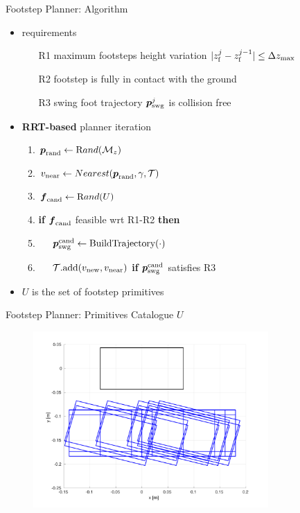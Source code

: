 \documentclass[10pt]{beamer}
\begin{document}
\begin{frame}{Footstep Planner: Algorithm}
  \begin{itemize}
    \item requirements
      \begin{itemize}[<alert@+>]
        \item[R1] maximum footsteps height variation
				    $|z_{\rm f}^j - z_{\rm f}^{j-1}| \le \Delta z_{\max}$
        \item[R2] footstep is fully in contact with the ground
        \item[R3] swing foot trajectory ${\mbox{\boldmath $p$}}_{\rm {swg}}^j$ is collision free
			\end{itemize}
    \item \textbf{RRT-based} planner iteration
      \begin{enumerate}[<alert@+>]
        \item ${\mbox{\boldmath $p$}}_{\rm rand} \leftarrow {\text Rand}(\mathcal{M}_z)$
				\item $v_{\rm near} \leftarrow Nearest({\mbox{\boldmath $p$}}_{\rm rand}, \gamma,
            \mathcal{T})$
        \item ${\mbox{\boldmath $f$}}_{\rm cand} \leftarrow {\text Rand}(U)$
				\item \textbf{if} ${\mbox{\boldmath $f$}}_{\rm cand}$ feasible wrt R1-R2 \textbf{then}
				\item $\quad$ ${\mbox{\boldmath $p$}}_{\rm swg}^{\rm cand}
						\leftarrow \text{BuildTrajectory}(\cdot)$
				\item $\quad$ $\mathcal{T}\text{.add}(v_{\rm new}, v_{\rm near})$
						\textbf{if} ${\mbox{\boldmath $p$}}_{\rm swg}^{\rm cand}$ satisfies R3
      \end{enumerate}
    \item $U$ is the set of footstep primitives
	\end{itemize}
\end{frame}

\begin{frame}{Footstep Planner: Primitives Catalogue $U$}
	\begin{figure}
		\centering
		\includegraphics[width=0.8\textwidth]{figures/catalogue-primitives.pdf}
	\end{figure}
\end{frame}
\end{document}
